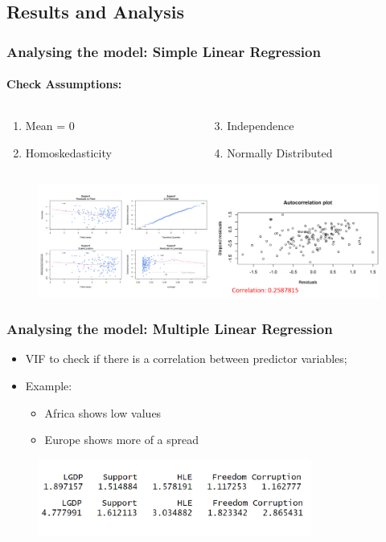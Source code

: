 \documentclass{beamer}
\begin{document}
\subsection{Results and Analysis}
% 
% 
% 
% 
\begin{frame}
  \frametitle{Analysing the model: Simple Linear Regression}
  \framesubtitle{Check Assumptions:}
  \begin{columns}[onlytextwidth]
    \begin{column}{0.5\textwidth}
      \begin{enumerate}
        \item Mean = 0
        \item Homoskedasticity
      \end{enumerate}
    \end{column}
    \begin{column}{0.5\textwidth}
      \begin{enumerate}
        \setcounter{enumi}{2}
        \item Independence
        \item Normally Distributed
      \end{enumerate}
    \end{column}
  \end{columns}
  \begin{figure}
    \includegraphics[width=\textwidth]{img/Assumption Check.png}
  \end{figure}
\end{frame}
% 
% 
% 
% 
% 
% 
% 
% 
\begin{frame}
  \frametitle{Analysing the model: Multiple Linear Regression}
  \begin{itemize}
    \item VIF to check if there is a correlation between predictor variables;
    \item Example: \begin{itemize}
            \item Africa shows low values
            \item Europe shows more of a spread
          \end{itemize}
  \end{itemize}
  \begin{figure}
    \includegraphics[width=0.8\textwidth]{img/Vif Check.png}
  \end{figure}
\end{frame}
\end{document}

